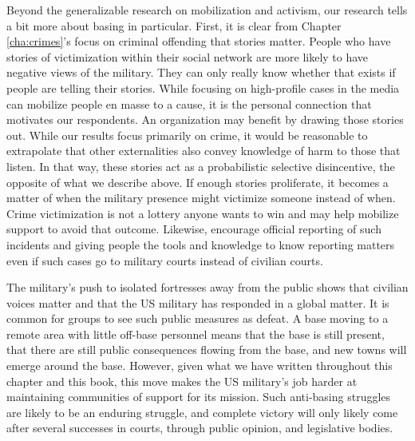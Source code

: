 Beyond the generalizable research on mobilization and activism, our research tells a bit more about basing in particular. First, it is clear from Chapter \ref{cha:crimes}'s focus on criminal offending that stories matter. People who have stories of victimization within their social network are more likely to have negative views of the military. They can only really know whether that exists if people are telling their stories. While focusing on high-profile cases in the media can mobilize people en masse to a cause, it is the personal connection that motivates our respondents. An organization may benefit by drawing those stories out. While our results focus primarily on crime, it would be reasonable to extrapolate that other externalities also convey knowledge of harm to those that listen. In that way, these stories act as a probabilistic selective disincentive, the opposite of what we describe above. If enough stories proliferate, it becomes a matter of when the military presence might victimize someone instead of when. Crime victimization is not a lottery anyone wants to win and may help mobilize support to avoid that outcome. Likewise, encourage official reporting of such incidents and giving people the tools and knowledge to know reporting matters even if such cases go to military courts instead of civilian courts. 

The military's push to isolated fortresses away from the public shows that civilian voices matter and that the US military has responded in a global matter. It is common for groups to see such public measures as defeat. A base moving to a remote area with little off-base personnel means that the base is still present, that there are still public consequences flowing from the base, and new towns will emerge around the base. However, given what we have written throughout this chapter and this book, this move makes the US military's job harder at maintaining communities of support for its mission. Such anti-basing struggles are likely to be an enduring struggle, and complete victory will only likely come after several successes in courts, through public opinion, and legislative bodies. 

